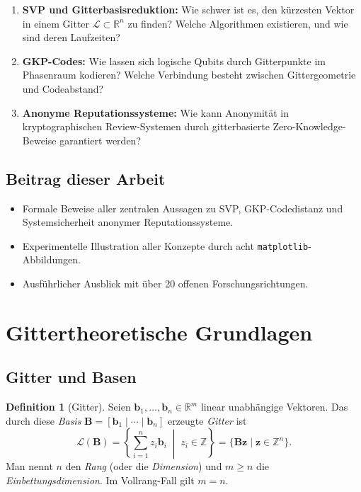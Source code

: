 ﻿\documentclass[a4paper,12pt]{article}
\theoremstyle{definition}
\newtheorem{definition}{Definition}
\newcommand{\Z}{\mathbb{Z}}
\newcommand{\R}{\mathbb{R}}
\newcommand{\Lat}{\mathcal{L}}
\newcommand{\B}{\mathbf{B}}
\begin{document}
\begin{enumerate}
    \item \textbf{SVP und Gitterbasisreduktion:}
          Wie schwer ist es, den kürzesten Vektor in einem Gitter $\Lat \subset \R^n$ zu finden?
          Welche Algorithmen existieren, und wie sind deren Laufzeiten?

    \item \textbf{GKP-Codes:}
          Wie lassen sich logische Qubits durch Gitterpunkte im Phasenraum kodieren?
          Welche Verbindung besteht zwischen Gittergeometrie und Codeabstand?

    \item \textbf{Anonyme Reputationssysteme:}
          Wie kann Anonymität in kryptographischen Review-Systemen durch gitterbasierte
          Zero-Knowledge-Beweise garantiert werden?
\end{enumerate}

\subsection{Beitrag dieser Arbeit}

\begin{itemize}
    \item Formale Beweise aller zentralen Aussagen zu SVP, GKP-Codedistanz und
          Systemsicherheit anonymer Reputationssysteme.
    \item Experimentelle Illustration aller Konzepte durch acht \texttt{matplotlib}-Abbildungen.
    \item Ausführlicher Ausblick mit über 20 offenen Forschungsrichtungen.
\end{itemize}

\section{Gittertheoretische Grundlagen}

\subsection{Gitter und Basen}

\begin{definition}[Gitter]
\label{def:gitter}
Seien $\mathbf{b}_1, \ldots, \mathbf{b}_n \in \R^m$ linear unabhängige Vektoren.
Das durch diese \emph{Basis} $\B = [\mathbf{b}_1 \mid \cdots \mid \mathbf{b}_n]$ erzeugte
\emph{Gitter} ist
\[
    \Lat(\B) = \left\{ \sum_{i=1}^{n} z_i \mathbf{b}_i \;\middle|\; z_i \in \Z \right\}
             = \{ \B \mathbf{z} \mid \mathbf{z} \in \Z^n \}.
\]
Man nennt $n$ den \emph{Rang} (oder die \emph{Dimension}) und $m \geq n$ die
\emph{Einbettungsdimension}.
Im Vollrang-Fall gilt $m = n$.
\end{definition}
\end{document}
